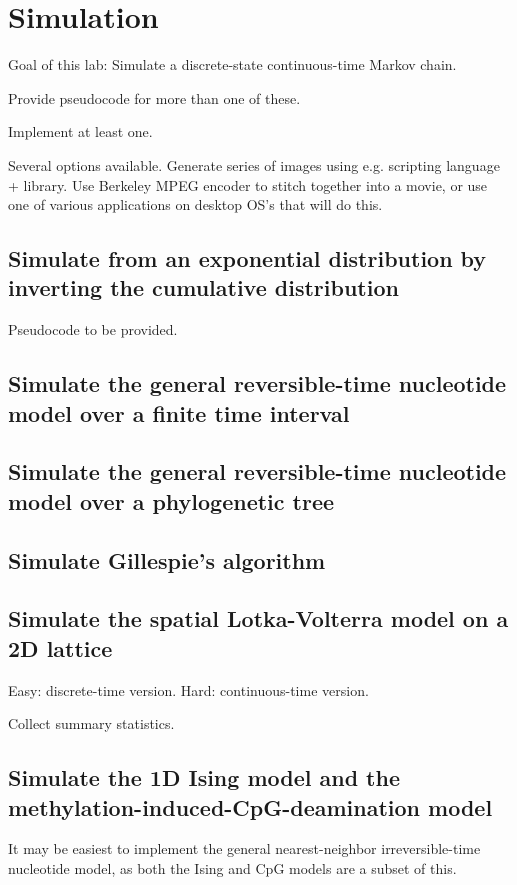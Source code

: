 \chapter{Simulation}

Goal of this lab:
Simulate a discrete-state continuous-time Markov chain.


Provide pseudocode for more than one of these.

Implement at least one.


Several options available.
Generate series of images using e.g. scripting language + library.
Use Berkeley MPEG encoder to stitch together into a movie,
or use one of various applications on desktop OS's that will do this.



\section{Simulate from an exponential distribution by inverting the cumulative distribution}

Pseudocode to be provided.

\section{Simulate the general reversible-time nucleotide model over a finite time interval}

\section{Simulate the general reversible-time nucleotide model over a phylogenetic tree}

\section{Simulate Gillespie's algorithm}

\cite{Gillespie77}

\section{Simulate the spatial Lotka-Volterra model on a 2D lattice}

Easy: discrete-time version.
Hard: continuous-time version.

Collect summary statistics.

\section{Simulate the 1D Ising model and the methylation-induced-CpG-deamination model}

It may be easiest to implement the general nearest-neighbor irreversible-time nucleotide model,
as both the Ising and CpG models are a subset of this.
